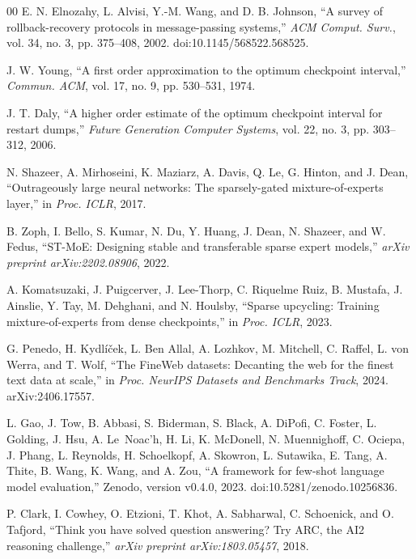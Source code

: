 \documentclass[10pt,conference]{IEEEtran}
\begin{document}
\begin{thebibliography}{00}
 E. N. Elnozahy, L. Alvisi, Y.-M. Wang, and D. B. Johnson, ``A survey of rollback-recovery protocols in message-passing systems,'' \textit{ACM Comput. Surv.}, vol. 34, no. 3, pp. 375--408, 2002. doi:10.1145/568522.568525.

 J. W. Young, ``A first order approximation to the optimum checkpoint interval,'' \textit{Commun. ACM}, vol. 17, no. 9, pp. 530--531, 1974.

 J. T. Daly, ``A higher order estimate of the optimum checkpoint interval for restart dumps,'' \textit{Future Generation Computer Systems}, vol. 22, no. 3, pp. 303--312, 2006.

 N. Shazeer, A. Mirhoseini, K. Maziarz, A. Davis, Q. Le, G. Hinton, and J. Dean, ``Outrageously large neural networks: The sparsely-gated mixture-of-experts layer,'' in \textit{Proc. ICLR}, 2017.

 B. Zoph, I. Bello, S. Kumar, N. Du, Y. Huang, J. Dean, N. Shazeer, and W. Fedus, ``ST-MoE: Designing stable and transferable sparse expert models,'' \textit{arXiv preprint arXiv:2202.08906}, 2022.

 A. Komatsuzaki, J. Puigcerver, J. Lee-Thorp, C. Riquelme Ruiz, B. Mustafa, J. Ainslie, Y. Tay, M. Dehghani, and N. Houlsby, ``Sparse upcycling: Training mixture-of-experts from dense checkpoints,'' in \textit{Proc. ICLR}, 2023.

 G. Penedo, H. Kydl{\'i}{\v c}ek, L. Ben Allal, A. Lozhkov, M. Mitchell, C. Raffel, L. von Werra, and T. Wolf, ``The FineWeb datasets: Decanting the web for the finest text data at scale,'' in \textit{Proc. NeurIPS Datasets and Benchmarks Track}, 2024. arXiv:2406.17557.

 L. Gao, J. Tow, B. Abbasi, S. Biderman, S. Black, A. DiPofi, C. Foster, L. Golding, J. Hsu, A. Le~Noac'h, H. Li, K. McDonell, N. Muennighoff, C. Ociepa, J. Phang, L. Reynolds, H. Schoelkopf, A. Skowron, L. Sutawika, E. Tang, A. Thite, B. Wang, K. Wang, and A. Zou, ``A framework for few-shot language model evaluation,'' Zenodo, version v0.4.0, 2023. doi:10.5281/zenodo.10256836.

 P. Clark, I. Cowhey, O. Etzioni, T. Khot, A. Sabharwal, C. Schoenick, and O. Tafjord, ``Think you have solved question answering? Try ARC, the AI2 reasoning challenge,'' \textit{arXiv preprint arXiv:1803.05457}, 2018.


\end{thebibliography}
\end{document}
